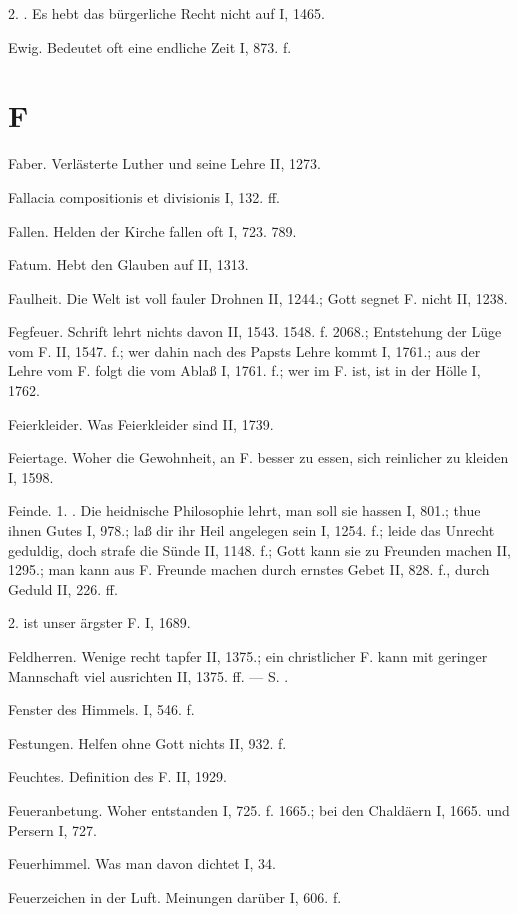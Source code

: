 2. . Es hebt das bürgerliche Recht nicht auf I, 1465.

Ewig. Bedeutet oft eine endliche Zeit I, 873. f.

\section{F}

Faber. Verlästerte Luther und seine Lehre II, 1273.

Fallacia compositionis et divisionis I, 132. ff.

Fallen. Helden der Kirche fallen oft I, 723. 789.

Fatum. Hebt den Glauben auf II, 1313.

Faulheit. Die Welt ist voll fauler Drohnen II, 1244.; Gott segnet F. nicht II, 1238.

Fegfeuer. Schrift lehrt nichts davon II, 1543. 1548. f. 2068.; Entstehung der Lüge vom F. II, 1547. f.; wer dahin nach des Papsts Lehre kommt I, 1761.; aus der Lehre vom F. folgt die vom Ablaß I, 1761. f.; wer im F. ist, ist in der Hölle I, 1762.

Feierkleider. Was Feierkleider sind II, 1739.

Feiertage. Woher die Gewohnheit, an F. besser zu essen, sich reinlicher zu kleiden I, 1598.

Feinde. 1. . Die heidnische Philosophie lehrt, man soll sie hassen I, 801.; thue ihnen Gutes I, 978.; laß dir ihr Heil angelegen sein I, 1254. f.; leide das Unrecht geduldig, doch strafe die Sünde II, 1148. f.; Gott kann sie zu Freunden machen II, 1295.; man kann aus F. Freunde machen durch ernstes Gebet II, 828. f., durch Geduld II, 226. ff.

2.  ist unser ärgster F. I, 1689.

Feldherren. Wenige recht tapfer II, 1375.; ein christlicher F. kann mit geringer Mannschaft viel ausrichten II, 1375. ff. — S. .

Fenster des Himmels. I, 546. f.

Festungen. Helfen ohne Gott nichts II, 932. f.

Feuchtes. Definition des F. II, 1929.

Feueranbetung. Woher entstanden I, 725. f. 1665.; bei den Chaldäern I, 1665. und Persern I, 727.

Feuerhimmel. Was man davon dichtet I, 34.

Feuerzeichen in der Luft. Meinungen darüber I, 606. f.


